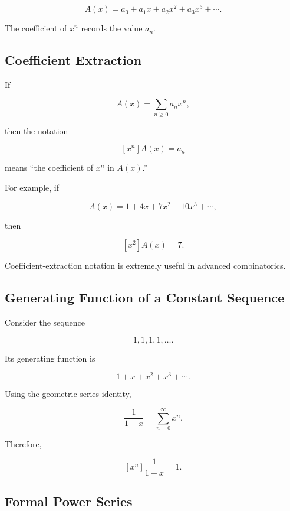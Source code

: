 \[
A(x)
=
a_0+a_1x+a_2x^2+a_3x^3+\cdots.
\]

The coefficient of \(x^n\) records the value \(a_n\).

\subsection{Coefficient Extraction}
\label{subsec:coefficient-extraction}

If

\[
A(x)=\sum_{n\geq0}a_nx^n,
\]

then the notation

\[
\boxed{
[x^n]A(x)=a_n
}
\]

means ``the coefficient of \(x^n\) in \(A(x)\).''

For example, if

\[
A(x)=1+4x+7x^2+10x^3+\cdots,
\]

then

\[
[x^2]A(x)=7.
\]

Coefficient-extraction notation is extremely useful in advanced
combinatorics.

\subsection{Generating Function of a Constant Sequence}
\label{subsec:gf-constant-sequence}

Consider the sequence

\[
1,1,1,1,\ldots.
\]

Its generating function is

\[
1+x+x^2+x^3+\cdots.
\]

Using the geometric-series identity,

\[
\boxed{
\frac{1}{1-x}
=
\sum_{n=0}^{\infty}x^n.
}
\]

Therefore,

\[
\boxed{
[x^n]\frac{1}{1-x}=1.
}
\]

\subsection{Formal Power Series}
\label{subsec:formal-power-series}

